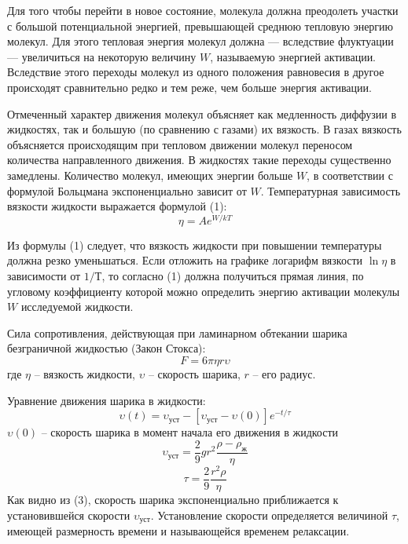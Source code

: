 \documentclass[a4paper,12pt]{article}
\theoremstyle{plain} %
\theoremstyle{definition} %
\theoremstyle{remark} %
\begin{document}
	Для того чтобы перейти в новое состояние, молекула должна преодолеть участки с большой потенциальной энергией, превышающей среднюю тепловую энергию молекул. Для этого тепловая энергия молекул должна — вследствие флуктуации — увеличиться на некоторую величину $W$, называемую энергией активации. Вследствие этого переходы молекул из одного положения равновесия в другое происходят сравнительно редко и тем реже, чем больше энергия активации.
	
	Отмеченный характер движения молекул объясняет как медленность диффузии в жидкостях, так и большую (по сравнению с газами) их вязкость. В газах вязкость объясняется происходящим при тепловом движении молекул переносом количества направленного движения. В жидкостях такие переходы существенно замедлены. Количество молекул, имеющих энергии больше $W$, в соответствии с формулой Больцмана экспоненциально зависит от $W$. Температурная зависимость вязкости жидкости выражается формулой (1):
	\begin{equation}
	\eta = Ae^{W/kT}
	\end{equation}
	
	Из формулы (1) следует, что вязкость жидкости при повышении температуры должна резко уменьшаться. Если отложить на графике логарифм вязкости $\ln \eta$ в зависимости от $1/Т$, то согласно (1) должна получиться прямая линия, по угловому коэффициенту которой можно определить энергию активации молекулы $W$ исследуемой жидкости. 
	
	Сила сопротивления, действующая при ламинарном обтекании шарика безграничной жидкостью (Закон Стокса):
	\begin{equation}
	F = 6\pi \eta r \upsilon 
	\end{equation}
	где $\eta$ -- вязкость жидкости, $\upsilon$ -- скорость шарика, $r$ -- его радиус.
	
	Уравнение движения шарика в жидкости:
	\begin{equation}
	\upsilon(t) = \upsilon_{\text{уст}} - [\upsilon_{\text{уст}} - \upsilon(0)]e^{-t/\tau}
	\end{equation}
	$\upsilon(0)$ -- скорость шарика в момент начала его движения в жидкости
	\begin{equation}
	\upsilon_{\text{уст}} = \frac{2}{9}gr^2\frac{\rho-\rho_{\text{ж}}}{\eta} 
	\end{equation}
	\[\tau = \frac{2}{9}\frac{r^2 \rho}{\eta}  \]
	Как видно из (3), скорость шарика экспоненциально приближается к установившейся скорости $\upsilon_{\text{уст}}$. Установление скорости определяется величиной $\tau$, имеющей размерность времени и называющейся временем релаксации.
	
\end{document}
